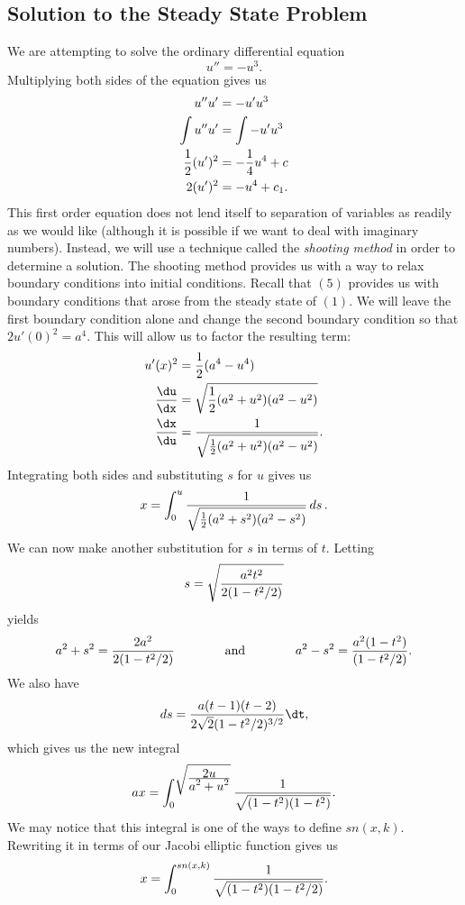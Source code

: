 \documentclass{hw}
\begin{document}
\subsection{Solution to the Steady State Problem}
We are attempting to solve the ordinary differential equation
\[
u''=-u^{3}.
\]
Multiplying both sides of the equation gives us
\begin{align*}
u''u'&=-u'u^{3}\\
\int u''u'&=\int -u'u^{3}\\
{1\over2}(u')^{2}&= -{1\over4}u^{4}+c\\
2(u')^{2}&=-u^{4}+c_{1}.
\end{align*}
This first order equation does not lend itself to separation of variables as readily as we would like
(although it is possible if we want to deal with imaginary numbers). Instead, we will use a technique
called the \textit{shooting method} in order to determine a solution. The shooting method provides
us with a way to relax boundary conditions into initial conditions. Recall that $(5)$ provides us
with boundary conditions that arose from the steady state of $(1)$. We will leave the first boundary
condition alone and change the second boundary condition so that $2u'(0)^{2}=a^{4}$. This will allow
us to factor the resulting term:
\begin{align*}
u'(x)^2&={1\over2}(a^{4}-u^{4})\\
{\du\over\dx}&= \sqrt{{1\over2}(a^{2}+u^{2})(a^{2}-u^{2})}\\
{\dx\over\du}&= {1\over\sqrt{{1\over2}(a^{2}+u^{2})(a^{2}-u^{2})}}.
\end{align*}
Integrating both sides and substituting $s$ for $u$ gives us
\[x=\int_{0}^{u}{1\over\sqrt{{1\over2}(a^{2}+s^{2})(a^{2}-s^{2})}}\mathop{ds}.\]
We can now make another substitution for $s$ in terms of $t$. Letting
\[
s=\sqrt{{a^2t^2\over2(1-t^2/2)}}
\]
yields
\[
a^2+s^2={2a^2\over2(1-t^2/2)}\qquad\qquad\text{and}\qquad\qquad
a^2-s^2={a^2(1-t^2)\over(1-t^2/2)}.
\]
We also have
\[
\mathop{ds}={a(t-1)(t-2)\over2\sqrt{2}(1-t^2/2)^{3/2}}\dt,
\]
which gives us the new integral
\[
ax=\int_{0}^{\sqrt{\frac{\displaystyle2u}{\displaystyle a^2+u^2}}}{1\over\sqrt{(1-t^2)(1-t^2)}}.
\]
We may notice that this integral is one of the ways to define $sn(x,k)$. Rewriting it in terms
of our Jacobi elliptic function gives us
\[
x=\int_{0}^{sn(x,k)}{1\over\sqrt{(1-t^2)(1-t^2/2)}}.
\]
\end{document}
